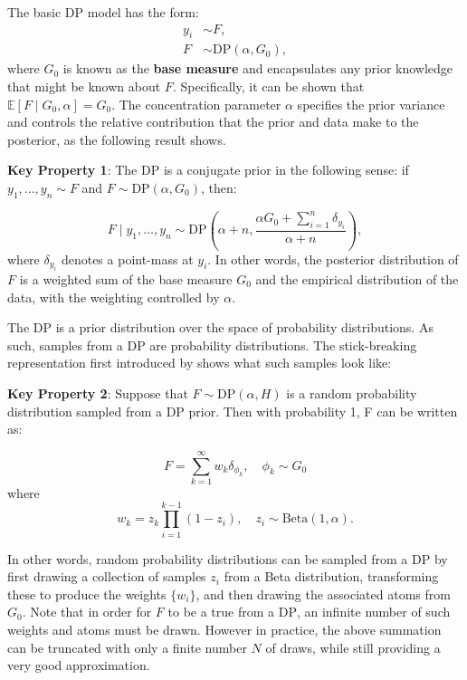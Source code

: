 \documentclass[nojss]{jss}
\begin{document}
The basic DP model has the form:
\begin{align*}
y_i & \sim F, \\
F & \sim \text{DP} (\alpha, G_0),
\end{align*}
where $G_0$ is known as the \textbf{base measure} and encapsulates any prior knowledge that might be known about $F$.  Specifically, it can be shown that $\mathbb{E}[F \mid G_0,\alpha] = G_0$. The concentration parameter $\alpha$ specifies the prior variance and controls the relative contribution that the prior and data make to the posterior, as the following result shows.

\begin{tcolorbox}

\textbf{Key Property 1}: The DP is a conjugate prior in the following sense: if $y_1,\ldots,y_n \sim F$ and $F \sim \text{DP} (\alpha, G_0)$, then:

$$F \mid y_1,\ldots,y_n \sim \text{DP} \left( \alpha + n, \frac{\alpha G_0 + \sum_{i=1}^n \delta_{y_i}}{\alpha+n}\right),$$
where $\delta_{y_i}$ denotes a point-mass at $y_i$. In other words, the posterior distribution of $F$ is a weighted sum of the base measure $G_0$ and the empirical distribution of the data, with the weighting controlled by $\alpha$.

\end{tcolorbox}

The DP is a prior distribution over the space of probability distributions. As such, samples from a DP are probability distributions. The stick-breaking representation first introduced by \cite{sethuraman_constructive_1994} shows what such samples look like:

\begin{tcolorbox}

\textbf{Key Property 2}:
Suppose that $F \sim \text{DP} (\alpha, H)$ is a random probability distribution sampled from a DP prior. Then with probability 1, F can be written as:

$$F = \sum_{k=1}^\infty w_k \delta_{\phi_k}, \quad \phi_k \sim G_0$$
where
$$w_k = z_k \prod_{i=1}^{k-1} (1-z_i),\quad z_i \sim \text{Beta}(1,\alpha).$$

\end{tcolorbox}

In other words, random probability distributions can be sampled from a DP by first drawing a collection of samples ${z_i}$ from a Beta distribution, transforming these to produce the weights $\{w_i\}$, and then drawing the associated atoms from $G_0$. Note that in order for $F$ to be a true from a $\text{DP}$, an infinite number of such weights and atoms must be drawn. However in practice, the above summation can be truncated with only a finite number $N$ of draws, while still providing a very good approximation.
\end{document}
